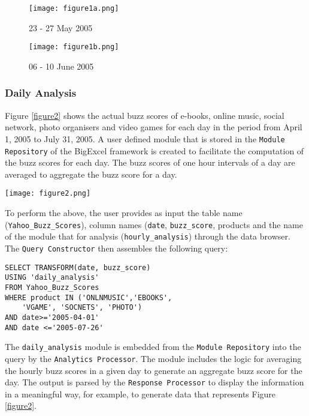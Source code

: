 \documentclass[10pt, conference, compsocconf]{IEEEtran}
\begin{document}
\begin{figure*}
	\centering
	\begin{subfigure} {\textwidth}
		\centering
  		\texttt{[image: figure1a.png]}
  		\caption{23 - 27 May 2005}
  		\label{figure1a}
	\end{subfigure} \hfill
	\begin{subfigure} {\textwidth}
		\centering
  		\texttt{[image: figure1b.png]}
  		\caption{06 - 10 June 2005}
  		\label{figure1b}
	\end{subfigure} 
	\caption{Buzz scores of video games on an hourly basis for a working week in May and June}
	\label{figure1}
\end{figure*}

\subsubsection{Daily Analysis}
Figure \ref{figure2} shows the actual buzz scores of e-books, online music, social network, photo organisers and video games for each day in the period from April 1, 2005 to July 31, 2005. A user defined module that is stored in the \texttt{Module Repository} of the BigExcel framework is created to facilitate the computation of the buzz scores for each day. The buzz scores of one hour intervals of a day are averaged to aggregate the buzz score for a day. 


\begin{figure*} [!ht]
	\centering
	\texttt{[image: figure2.png]}
	\caption{Daily aggregated buzz scores of technologies from April 1, 2005 to July 31, 2005}
	\label{figure2}
\end{figure*} 

To perform the above, the user provides as input the table name (\texttt{Yahoo\_Buzz\_Scores}), column names (\texttt{date}, \texttt{buzz\_score}, products and the name of the module that for analysis (\texttt{hourly\_analysis}) through the data browser. The \texttt{Query Constructor} then assembles the following query:

\begin{verbatim}
SELECT TRANSFORM(date, buzz_score)
USING 'daily_analysis' 
FROM Yahoo_Buzz_Scores
WHERE product IN ('ONLNMUSIC','EBOOKS', 
	'VGAME', 'SOCNETS', 'PHOTO')
AND date>='2005-04-01' 
AND date <='2005-07-26'
\end{verbatim}

The \texttt{daily\_analysis} module is embedded from the \texttt{Module Repository} into the query by the \texttt{Analytics Processor}. The module includes the logic for averaging the hourly buzz scores in a given day to generate an aggregate buzz score for the day. The output is parsed by the \texttt{Response Processor} to display the information in a meaningful way, for example, to generate data that represents Figure \ref{figure2}. 
\end{document}
